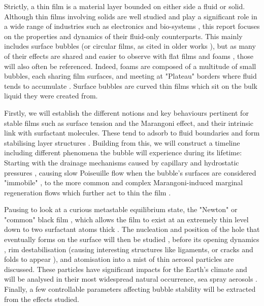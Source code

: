 \documentclass[a4paper,12pt]{article}
\numberwithin{equation}{section}
\numberwithin{figure}{section}
\numberwithin{table}{section}
\begin{document}
Strictly, a thin film is a material layer bounded on either side a fluid or solid. Although thin films involving solids are well studied and play a significant role in a wide range of industries such as electronics and bio-systems \cite{SolidThinFilms}, this report focuses on the properties and dynamics of their fluid-only counterparts. This mainly includes surface bubbles (or circular films, as cited in older works \cite{Vrij1968, VrijDiscussion1966}), but as many of their effects are shared and easier to observe with flat films and foams \cite{Braun2002}, those will also often be referenced. Indeed, foams are composed of a multitude of small bubbles, each sharing film surfaces, and meeting at "Plateau" borders where fluid tends to accumulate \cite{Almgren1976}. Surface bubbles are curved thin films which sit on the bulk liquid they were created from. %

Firstly, we will establish the different notions and key behaviours pertinent for stable films such as surface tension and the Marangoni effect, and their intrinsic link with surfactant molecules. These tend to adsorb to fluid boundaries \cite{Gast1997} and form stabilising layer structures \cite{Mysels1968Nomenclature}. Building from this, we will construct a timeline including different phenomena the bubble will experience during its lifetime: Starting with the drainage mechanisms caused by capillary and hydrostatic pressures \cite{Lhuissier2011}, causing slow Poiseuille flow when the bubble's surfaces are considered "immobile" \cite{Nierstrasz1999, Bruinsma1995, Modini2013}, to the more common and complex Marangoni-induced marginal regeneration flows which further act to thin the film \cite{Mysels1959Book, Bhamla2017, Bruinsma1995}.

Pausing to look at a curious metastable equilibrium state, the "Newton" or "common" black film \cite{Seung2006}, which allows the film to exist at an extremely thin level down to two surfactant atoms thick \cite{Casteletto2003}. The nucleation and position of the hole that eventually forms on the surface will then be studied \cite{ChampougnyNotBare2016, Debregeas1998}, before its opening dynamics \cite{Culick1960}, rim destabilisation (causing interesting structures like ligaments, or cracks and folds to appear \cite{Bico2015, Lhuissier2009}), and atomisation into a mist of thin aerosol particles \cite{Modini2013} are discussed. These particles have significant impacts for the Earth's climate and will be analysed in their most widespread natural occurrence, sea spray aerosols \cite{Lhuissier2011, Modini2013, Andreas1995, Wang2017}. Finally, a few controllable parameters affecting bubble stability will be extracted from the effects studied.
\end{document}
